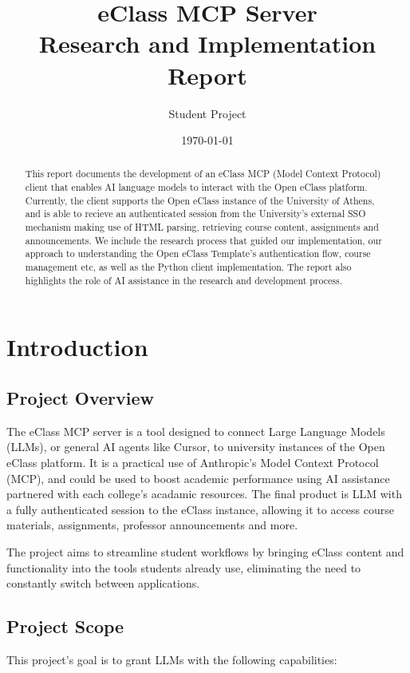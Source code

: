 \documentclass[11pt,a4paper]{article}
\title{\Huge \textbf{eClass MCP Server}\\\large Research and Implementation Report}
\author{Student Project}
\date{\today}
\begin{document}
\maketitle
\thispagestyle{fancy}

\begin{abstract}
This report documents the development of an eClass MCP (Model Context Protocol) client that enables AI language models to interact with the Open eClass platform. Currently, the client supports the Open eClass instance of the University of Athens, and is able to recieve an authenticated session from the University's external SSO mechanism making use of HTML parsing, retrieving course content, assignments and announcements. We include the research process that guided our implementation, our approach to understanding the Open eClass Template's authentication flow, course management etc, as well as the Python client implementation. The report also highlights the role of AI assistance in the research and development process.
\end{abstract}

\tableofcontents
\newpage

\section{Introduction}
\subsection{Project Overview}
The eClass MCP server is a tool designed to connect Large Language Models (LLMs), or general AI agents like Cursor, to university instances of the Open eClass platform. It is a practical use of Anthropic's Model Context Protocol (MCP), and could be used to boost academic performance using AI assistance partnered with each college's acadamic resources. The final product is LLM with a fully authenticated session to the eClass instance, allowing it to access course materials, assignments, professor announcements and more.

The project aims to streamline student workflows by bringing eClass content and functionality into the tools students already use, eliminating the need to constantly switch between applications.

\subsection{Project Scope}
This project's goal is to grant LLMs with the following capabilities:
\end{document}
